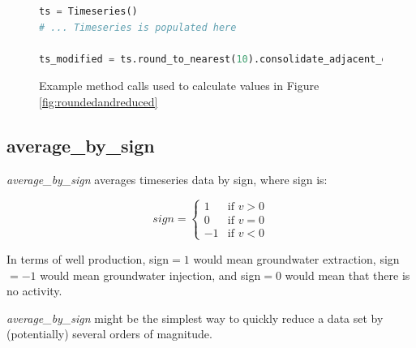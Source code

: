 \documentclass{book}
\begin{document}
\begin{figure}[H]
\begin{lstlisting}[language=python]
ts = Timeseries()
# ... Timeseries is populated here

ts_modified = ts.round_to_nearest(10).consolidate_adjacent_equal_values()
\end{lstlisting}
\caption{Example method calls used to calculate values in Figure \ref{fig:roundedandreduced}}
\end{figure}

\subsection{average\_by\_sign}
\emph{average\_by\_sign} averages timeseries data by sign, where sign is:

\begin{equation}
  sign = 
    \begin{cases}
      1 & \text{if $v > 0 $} \\
      0 & \text{if $v = 0 $} \\
     -1 & \text{if $v < 0 $} 
    \end{cases}
\end{equation}

In terms of well production, sign$=1$ would mean groundwater extraction, 
sign$=-1$ would mean groundwater injection, and sign$=0$ would mean that
there is no activity.

 \emph{average\_by\_sign} might be the simplest way to quickly reduce a 
 data set by (potentially) several orders of magnitude.
\end{document}
